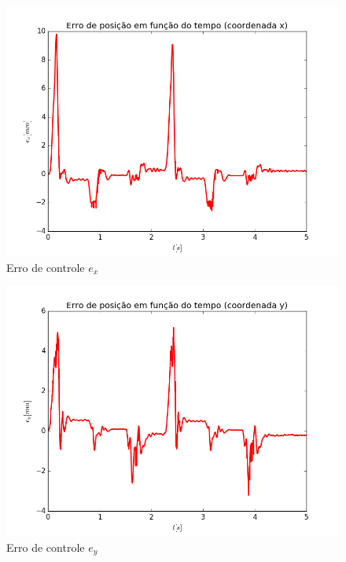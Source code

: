 \documentclass[]{politex}
\begin{document}
\begin{multicols}{2}
\begin{figure}[H]
	\centering
	\includegraphics[scale=0.39]{../../../Experimental/Aquisicoes/CTCx_triangulo/ex.png}  
	\caption{Erro de controle $e_x$}
	\label{fig:CTCx_triangulo_ex}
\end{figure}
\begin{figure}[H]
	\centering
	\includegraphics[scale=0.39]{../../../Experimental/Aquisicoes/CTCx_triangulo/ey.png}  
	\caption{Erro de controle $e_y$}
	\label{fig:CTCx_triangulo_ey}
\end{figure}
\end{multicols}
\end{document}
